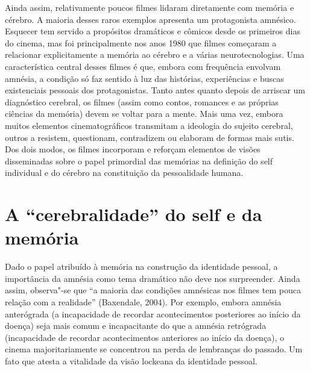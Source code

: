 Ainda assim, relativamente poucos filmes lidaram diretamente com memória
e cérebro. A maioria desses raros exemplos apresenta um protagonista
amnésico. Esquecer tem servido a propósitos dramáticos e cômicos desde
os primeiros dias do cinema, mas foi principalmente nos anos 1980 que
filmes começaram a relacionar explicitamente a memória ao cérebro e a
várias neurotecnologias. Uma característica central desses filmes é que,
embora com frequência envolvam amnésia, a condição só faz sentido à luz
das histórias, experiências e buscas existenciais pessoais dos
protagonistas. Tanto antes quanto depois de arriscar um diagnóstico
cerebral, os filmes (assim como contos, romances e as próprias ciências
da memória) devem se voltar para a mente. Mais uma vez, embora muitos
elementos cinematográficos transmitam a ideologia do sujeito cerebral,
outros a resistem, questionam, contradizem ou elaboram de formas mais
sutis. Dos dois modos, os filmes incorporam e reforçam elementos de
visões disseminadas sobre o papel primordial das memórias na definição
do self individual e do cérebro na constituição da pessoalidade humana.

\chapter{A ``cerebralidade'' do self e da memória}

Dado o papel atribuído à memória na construção da identidade pessoal, a
importância da amnésia como tema dramático não deve nos surpreender.
Ainda assim, observa"-se que ``a maioria das condições amnésicas nos
filmes tem pouca relação com a realidade'' (Baxendale, 2004). Por
exemplo, embora amnésia anterógrada (a incapacidade de recordar
acontecimentos posteriores ao início da doença) seja mais comum e
incapacitante do que a amnésia retrógrada (incapacidade de recordar
acontecimentos anteriores ao início da doença), o cinema
majoritariamente se concentrou na perda de lembranças do passado. Um
fato que atesta a vitalidade da visão lockeana da identidade pessoal.

